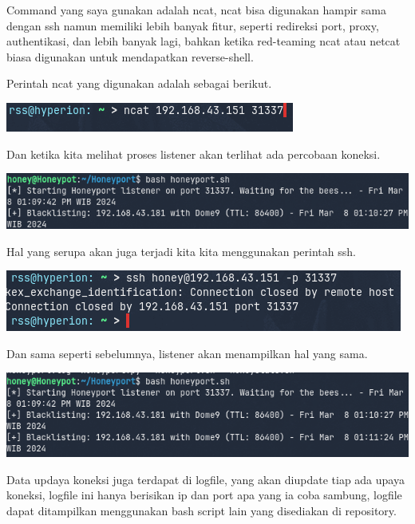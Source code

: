\documentclass[12pt, a4paper]{article}
\begin{document}
  Command yang saya gunakan adalah ncat, ncat bisa digunakan hampir sama dengan
  ssh namun memiliki lebih banyak fitur, seperti redireksi port, proxy, authentikasi,
  dan lebih banyak lagi, bahkan ketika red-teaming ncat atau netcat biasa digunakan
  untuk mendapatkan reverse-shell.

  Perintah ncat yang digunakan adalah sebagai berikut.

  \begin{center}
    \includegraphics[scale=0.8]{NCATCMD}
  \end{center}

  Dan ketika kita melihat proses listener akan terlihat ada percobaan koneksi.

  \begin{center}
    \includegraphics[scale=0.5]{NCATRESP}
  \end{center}

  Hal yang serupa akan juga terjadi kita kita menggunakan perintah ssh.

  \begin{center}
    \includegraphics[scale=0.8]{SSHCMD}
  \end{center}

  Dan sama seperti sebelumnya, listener akan menampilkan hal yang sama.

  \begin{center}
    \includegraphics[scale=0.5]{SSHRESP}
  \end{center}

  Data updaya koneksi juga terdapat di logfile, yang akan diupdate tiap ada
  upaya koneksi, logfile ini hanya berisikan ip dan port apa yang ia coba sambung,
  logfile dapat ditampilkan menggunakan bash script lain yang disediakan di
  repository.
\end{document}
